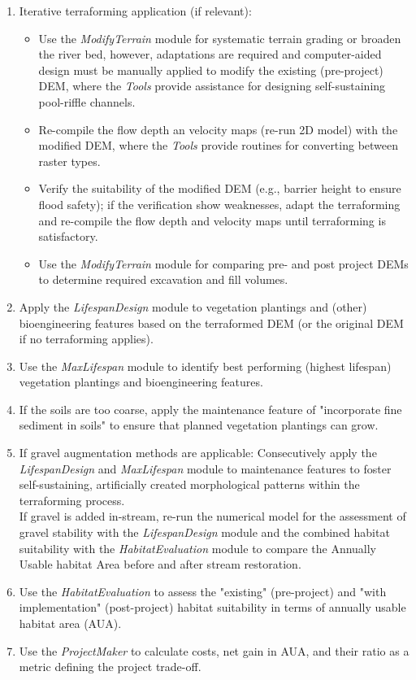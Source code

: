 \begin{enumerate}
	\item Iterative terraforming application (if relevant):
	\begin{itemize}
	  \item Use the \textit{ModifyTerrain} module for systematic terrain grading or broaden the river bed, however, adaptations are required and computer-aided design must be manually applied to modify the existing (pre-project) DEM, where the \textit{Tools} provide assistance for designing self-sustaining pool-riffle channels.
	  \item Re-compile the flow depth an velocity maps (re-run 2D model) with the modified DEM, where the \textit{Tools} provide routines for converting between raster types.
	  \item Verify the suitability of the modified DEM (e.g., barrier height to ensure flood safety); if the verification show weaknesses, adapt the terraforming and re-compile the flow depth and velocity maps until terraforming is satisfactory.
	  \item Use the \textit{ModifyTerrain} module for comparing pre- and post project DEMs to determine required excavation and fill volumes.
	\end{itemize}	
	\item Apply the \textit{LifespanDesign} module to vegetation plantings and (other) bioengineering features based on the terraformed DEM (or the original DEM if no terraforming applies).
	\item Use the \textit{MaxLifespan} module to identify best performing (highest lifespan) vegetation plantings and bioengineering features.
	\item If the soils are too coarse, apply the maintenance feature of "incorporate fine sediment in soils" to ensure that planned vegetation plantings can grow.
	\item If gravel augmentation methods are applicable: Consecutively apply the \textit{LifespanDesign} and \textit{MaxLifespan} module to maintenance features to foster self-sustaining, artificially created morphological patterns within the terraforming process.\\
	If gravel is added in-stream, re-run the numerical model for the assessment of gravel stability with the \textit{LifespanDesign} module and the combined habitat suitability with the \textit{HabitatEvaluation} module to compare the Annually Usable habitat Area before and after stream restoration.
	\item Use the \textit{HabitatEvaluation} to assess the "existing" (pre-project) and "with implementation" (post-project) habitat suitability in terms of annually usable habitat area (AUA).
	\item Use the \textit{ProjectMaker} to calculate costs, net gain in AUA, and their ratio as a metric defining the project trade-off.
\end{enumerate}

